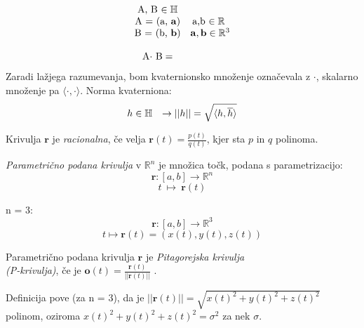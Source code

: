 \documentclass[mat1]{fmfdelo}
\newcommand{\R}{\mathbb R}
\newcommand{\HH}{\mathbb H}
\newcommand{\rr}{\boldsymbol r}
\begin{document}
\begin{equation*}
\begin{array}{c c}
\text{A,$~$B $\in \HH$} & \\
\text{A = (a, $\mathbf{a}$)} & \text{a,b $\in \R$ }\\
\text{B = (b, $\mathbf{b}$)} & \mathbf{a}, \mathbf{b} \in \R^3\\
&\\
\text{A$\cdot$ B} = &
\end{array}
\end{equation*}
Zaradi lažjega razumevanja, bom kvaternionsko množenje označevala z $\cdot$, skalarno množenje pa $\langle\cdot,\cdot\rangle$.
Norma kvaterniona:
\begin{equation*}
\begin{array}{c c}
h \in \HH & \rightarrow ||h|| = \sqrt{\langle h, \overline{h}\rangle}
\end{array}
\end{equation*}
\begin{definicija}
Krivulja $\rr$ je \textit{racionalna}, če velja $\rr(t) = \frac{p(t)}{q(t)}$, kjer sta $p$ in $q$ polinoma.
\end{definicija}
\begin{definicija}
\textit{Parametrično podana krivulja} v $\R^n$ je množica točk, podana s parametrizacijo:
\begin{equation*}
\rr: [ a,b ] \rightarrow \R^n
\end{equation*}
\begin{equation*}
t ~ \longmapsto ~\rr(t)
\end{equation*}
\end{definicija}
\begin{primer}
n = 3:
\begin{equation*}
\rr:[a,b] \rightarrow \R^3
\end{equation*}
\begin{equation*}
t \longmapsto \rr(t) = (x(t),y(t),z(t))
\end{equation*}
\end{primer}
\begin{definicija}
Parametrično podana krivulja $\rr$ je \textit{Pitagorejska krivulja\\ (P-krivulja)}, če je $\boldsymbol{o}(t) = \frac{\rr(t)}{||\rr(t)||}$ .
\end{definicija}
\begin{opomba}
Definicija pove (za n = 3), da je $||\rr(t)|| = \sqrt{x(t)^2 + y(t)^2 + z(t)^2}$ polinom, oziroma $x(t)^2 + y(t)^2 + z(t)^2 = \sigma^2$ za nek $\sigma$.
\end{opomba}
\end{document}

